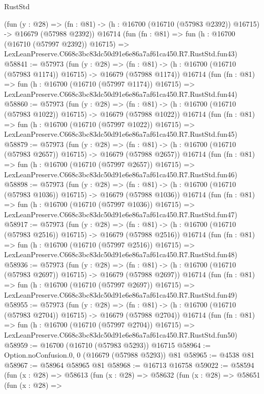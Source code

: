 \begin{lexlean}{RustStd}
\begin{coremodule}
    (fun (y : @28) =>
    (fn : @81) -> (h : @16700 (@16710 (@57983 @2392)) @16715) -> @16679 (@57988 @2392))
    @16714
    (fun (fn : @81) =>
    fun (h : @16700 (@16710 (@57997 @2392)) @16715) =>
    LexLeanPreserve.C668c3bc83dc50d91e6e86a7af61ca450.R7.RustStd.fun43)
@58841 := @57973
    (fun (y : @28) =>
    (fn : @81) -> (h : @16700 (@16710 (@57983 @1174)) @16715) -> @16679 (@57988 @1174))
    @16714
    (fun (fn : @81) =>
    fun (h : @16700 (@16710 (@57997 @1174)) @16715) =>
    LexLeanPreserve.C668c3bc83dc50d91e6e86a7af61ca450.R7.RustStd.fun44)
@58860 := @57973
    (fun (y : @28) =>
    (fn : @81) -> (h : @16700 (@16710 (@57983 @1022)) @16715) -> @16679 (@57988 @1022))
    @16714
    (fun (fn : @81) =>
    fun (h : @16700 (@16710 (@57997 @1022)) @16715) =>
    LexLeanPreserve.C668c3bc83dc50d91e6e86a7af61ca450.R7.RustStd.fun45)
@58879 := @57973
    (fun (y : @28) =>
    (fn : @81) -> (h : @16700 (@16710 (@57983 @2657)) @16715) -> @16679 (@57988 @2657))
    @16714
    (fun (fn : @81) =>
    fun (h : @16700 (@16710 (@57997 @2657)) @16715) =>
    LexLeanPreserve.C668c3bc83dc50d91e6e86a7af61ca450.R7.RustStd.fun46)
@58898 := @57973
    (fun (y : @28) =>
    (fn : @81) -> (h : @16700 (@16710 (@57983 @1036)) @16715) -> @16679 (@57988 @1036))
    @16714
    (fun (fn : @81) =>
    fun (h : @16700 (@16710 (@57997 @1036)) @16715) =>
    LexLeanPreserve.C668c3bc83dc50d91e6e86a7af61ca450.R7.RustStd.fun47)
@58917 := @57973
    (fun (y : @28) =>
    (fn : @81) -> (h : @16700 (@16710 (@57983 @2516)) @16715) -> @16679 (@57988 @2516))
    @16714
    (fun (fn : @81) =>
    fun (h : @16700 (@16710 (@57997 @2516)) @16715) =>
    LexLeanPreserve.C668c3bc83dc50d91e6e86a7af61ca450.R7.RustStd.fun48)
@58936 := @57973
    (fun (y : @28) =>
    (fn : @81) -> (h : @16700 (@16710 (@57983 @2697)) @16715) -> @16679 (@57988 @2697))
    @16714
    (fun (fn : @81) =>
    fun (h : @16700 (@16710 (@57997 @2697)) @16715) =>
    LexLeanPreserve.C668c3bc83dc50d91e6e86a7af61ca450.R7.RustStd.fun49)
@58955 := @57973
    (fun (y : @28) =>
    (fn : @81) -> (h : @16700 (@16710 (@57983 @2704)) @16715) -> @16679 (@57988 @2704))
    @16714
    (fun (fn : @81) =>
    fun (h : @16700 (@16710 (@57997 @2704)) @16715) =>
    LexLeanPreserve.C668c3bc83dc50d91e6e86a7af61ca450.R7.RustStd.fun50)
@58959 := @16700 (@16710 (@57983 @5293)) @16715
@58964 := Option.noConfusion.{0, 0} (@16679 (@57988 @5293)) @81
@58965 := @4538 @81
@58967 := @58964 @58965 @81
@58968 := @16713 @16758
@59022 := @58594
    (fun (x : @28) =>
    @58613
      (fun (x : @28) =>
      @58632
        (fun (x : @28) =>
        @58651
          (fun (x : @28) =>

\end{coremodule}
\end{lexlean}
